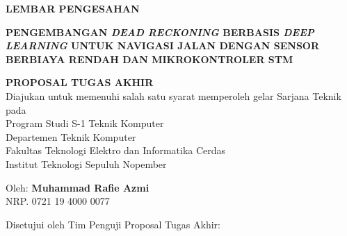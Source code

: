 \begin{center}
	\large
  \textbf{LEMBAR PENGESAHAN}
\end{center}

\thispagestyle{empty}

\begin{center}
  \textbf{PENGEMBANGAN \emph{DEAD RECKONING} BERBASIS \emph{DEEP LEARNING}  
  UNTUK NAVIGASI JALAN DENGAN SENSOR BERBIAYA RENDAH 
  DAN MIKROKONTROLER STM}
\end{center}

\begingroup
  \small

  \begin{center}
    \textbf{PROPOSAL TUGAS AKHIR} \\
    Diajukan untuk memenuhi salah satu syarat memperoleh gelar
    Sarjana Teknik pada \\
    Program Studi S-1 Teknik Komputer \\
    Departemen Teknik Komputer \\
    Fakultas Teknologi Elektro dan Informatika Cerdas \\
    Institut Teknologi Sepuluh Nopember \\
  \end{center}

  \begin{center}
    Oleh: \textbf{Muhammad Rafie Azmi} \\
    NRP. 0721 19 4000 0077
  \end{center}

  \begin{center}
    Disetujui oleh Tim Penguji Proposal Tugas Akhir:
  \end{center}

  \begingroup
    \setlength{\tabcolsep}{0pt}

